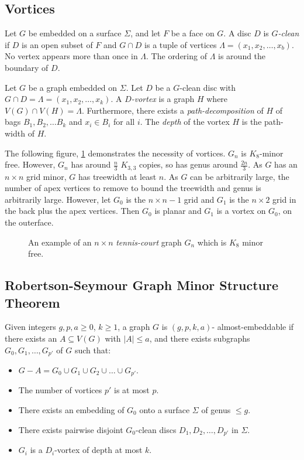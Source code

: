 \subsection{Vortices}\label{sssec:vortices}
Let \(G\) be embedded on a surface \(\Sigma\), and let \(F\) be a face on \(G\). A disc $D$ is \textit{$G$-clean} if $D$ is an open subset of $F$ and $G \cap D$ is a tuple of vertices \(\Lambda = (x_1, x_2, \ldots, x_b)\). No vertex appears more than once in $\Lambda$. The ordering of $\Lambda$ is around the boundary of $D$. 
\par
Let $G$ be a graph embedded on $\Sigma$. Let $D$ be a $G$-clean disc with $G \cap D = \Lambda = (x_1, x_2, \ldots, x_k)$. A \textit{$D$-vortex} is a graph $H$ where $V(G) \cap V(H) = \Lambda$. Furthermore, there exists a \textit{path-decomposition} of \(H\) of bags \(B_1, B_2, \ldots B_k\) and \(x_i \in B_i\) for all \(i\). The \textit{depth} of the vortex $H$ is the path-width of $H$. 
\par
The following figure, \cref{fig:tenniscourt} demonstrates the necessity of vortices. $G_n$ is $K_8$-minor free. However, $G_n$ has around $\frac{n}{3}$ $K_{3,3}$ copies, so has genus around $\frac{2n}{3}$. As $G$ has an $n \times n$ grid minor, $G$ has treewidth at least $n$. As $G$ can be arbitrarily large, the number of apex vertices to remove to bound the treewidth and genus is arbitrarily large. However, let $G_0$ is the $n \times n - 1$ grid and $G_1$ is the $n \times 2$ grid in the back plus the apex vertices. Then $G_0$ is planar and $G_1$ is a vortex on $G_0$, on the outerface. 

\begin{figure}[h]
	\centering
	
	\caption[Tennis-Court graph]{An example of an $n \times n$ \textit{tennis-court} graph $G_n$ which is \(K_8\) minor free.}
	\label{fig:tenniscourt}
\end{figure}
\subsection{Robertson-Seymour Graph Minor Structure Theorem}\label{ssec:Robertson_Seymour_Graph_Structure}
Given integers \(g, p, a \geq 0\), \(k \geq 1\), a graph \(G\) is \((g, p, k, a)\)- almost-embeddable if there exists an \(A \subseteq V(G)\) with \(|A| \leq a\), and there exists subgraphs \(G_0, G_1, \ldots,  G_{p'}\) of \(G\) such that:
\begin{itemize}
	\item \(G - A = G_0 \cup G_1 \cup G_2 \cup \ldots \cup G_{p'}\).
	\item The number of vortices $p'$ is at most $p$.
	\item There exists an embedding of \(G_0\) onto a surface \(\Sigma\) of genus \(\leq g\).
	\item There exists pairwise disjoint \(G_0\)-clean discs \(D_1, D_2, \ldots, D_{p'}\) in \(\Sigma\).
	\item \(G_i\) is a \(D_i\)-vortex of depth at most \(k\).
\end{itemize}

